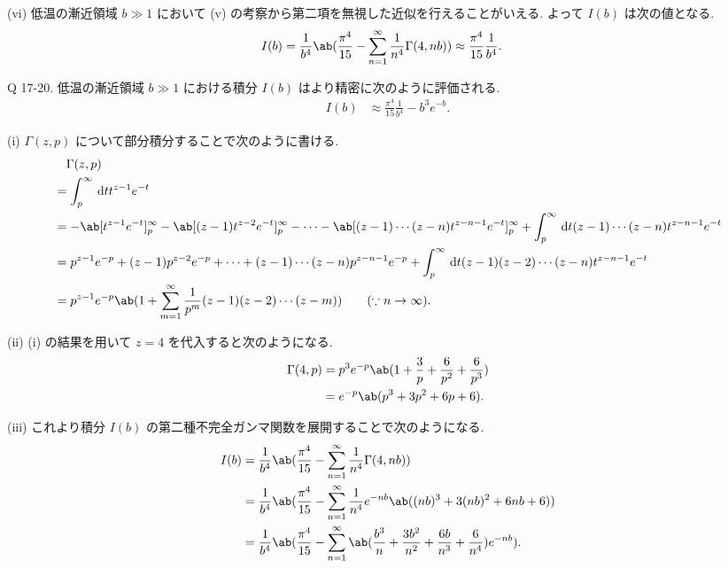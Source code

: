 \documentclass[uplatex,diffipdfmx,a4paper,11pt]{jlreq}
\theoremstyle{definition}
\begin{document}
(vi) 低温の漸近領域 $b\gg 1$ において (v) の考察から第二項を無視した近似を行えることがいえる. よって $I(b)$ は次の値となる.
\begin{align}
  I(b) & = \frac{1}{b^4}\ab(\frac{\pi^4}{15} - \sum_{n=1}^{\infty}\frac{1}{n^4}\Gamma(4, nb)) \approx \frac{\pi^4}{15}\frac{1}{b^4}.
\end{align}

\begin{itembox}[l]{Q 17-20.}
  低温の漸近領域 $b\gg 1$ における積分 $I(b)$ はより精密に次のように評価される.
  \begin{align}
    I(b) & \approx \frac{\pi^4}{15}\frac{1}{b^4} - b^3e^{-b}.
  \end{align}
\end{itembox}

(i)
$\Gamma(z, p)$ について部分積分することで次のように書ける.
\begin{align}
   & \quad \Gamma(z, p)                                                                                                                                                               \\
   & = \int_p^\infty\dl{t}t^{z-1}e^{-t}                                                                                                                                               \\
   & = -\ab[t^{z-1}e^{-t}]_p^\infty - \ab[(z-1)t^{z-2}e^{-t}]_p^\infty - \cdots - \ab[(z-1)\cdots(z-n)t^{z-n-1}e^{-t}]_p^\infty + \int_p^\infty\dl{t} (z-1)\cdots(z-n)t^{z-n-1}e^{-t} \\
   & = p^{z-1}e^{-p} + (z-1)p^{z-2}e^{-p} + \cdots + (z-1)\cdots(z-n)p^{z-n-1}e^{-p} + \int_p^\infty\dl{t} (z-1)(z-2)\cdots(z-n)t^{z-n-1}e^{-t}                                       \\
   & = p^{z-1}e^{-p}\ab(1 + \sum_{m=1}^{\infty}\frac{1}{p^m}(z-1)(z-2)\cdots(z-m)) \qquad (\because n\to\infty).
\end{align}

(ii)
(i) の結果を用いて $z = 4$ を代入すると次のようになる.
\begin{align}
  \Gamma(4, p) & = p^{3}e^{-p}\ab(1 + \frac{3}{p} + \frac{6}{p^2} + \frac{6}{p^3}) \\
               & = e^{-p}\ab(p^3 + 3p^2 + 6p + 6).
\end{align}

(iii)
これより積分 $I(b)$ の第二種不完全ガンマ関数を展開することで次のようになる.
\begin{align}
  I(b) & = \frac{1}{b^4}\ab(\frac{\pi^4}{15} - \sum_{n=1}^{\infty}\frac{1}{n^4}\Gamma(4, nb))                                                     \\
       & = \frac{1}{b^4}\ab(\frac{\pi^4}{15} - \sum_{n=1}^{\infty}\frac{1}{n^4}e^{-nb}\ab((nb)^3 + 3(nb)^2 + 6nb + 6))                            \\
       & = \frac{1}{b^4}\ab(\frac{\pi^4}{15} - \sum_{n=1}^{\infty}\ab(\frac{b^3}{n} + \frac{3b^2}{n^2} + \frac{6b}{n^3} + \frac{6}{n^4})e^{-nb}).
\end{align}
\end{document}
